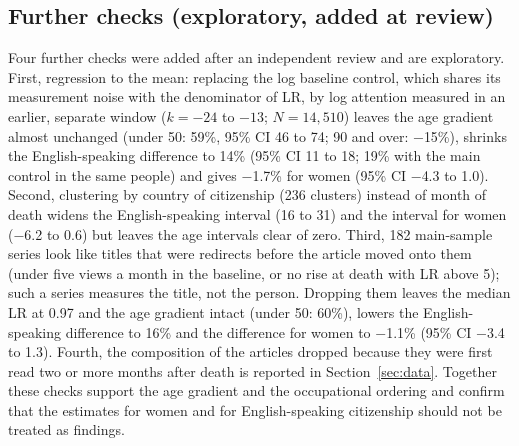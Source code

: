\documentclass[11pt,a4paper]{article}
\begin{document}
\subsection{Further checks (exploratory, added at review)}
Four further checks were added after an independent review and are exploratory. First, regression to the mean: replacing the log baseline control, which shares its measurement noise with the denominator of LR, by log attention measured in an earlier, separate window ($k = -24$ to $-13$; $N = 14,510$) leaves the age gradient almost unchanged (under 50: 59\%, 95\% CI 46 to 74; 90 and over: $-$15\%), shrinks the English-speaking difference to 14\% (95\% CI 11 to 18; 19\% with the main control in the same people) and gives $-$1.7\% for women (95\% CI $-$4.3 to 1.0). Second, clustering by country of citizenship (236 clusters) instead of month of death widens the English-speaking interval (16 to 31) and the interval for women ($-$6.2 to 0.6) but leaves the age intervals clear of zero. Third, 182 main-sample series look like titles that were redirects before the article moved onto them (under five views a month in the baseline, or no rise at death with LR above 5); such a series measures the title, not the person. Dropping them leaves the median LR at 0.97 and the age gradient intact (under 50: 60\%), lowers the English-speaking difference to 16\% and the difference for women to $-$1.1\% (95\% CI $-$3.4 to 1.3). Fourth, the composition of the articles dropped because they were first read two or more months after death is reported in Section~\ref{sec:data}. Together these checks support the age gradient and the occupational ordering and confirm that the estimates for women and for English-speaking citizenship should not be treated as findings.
\end{document}
